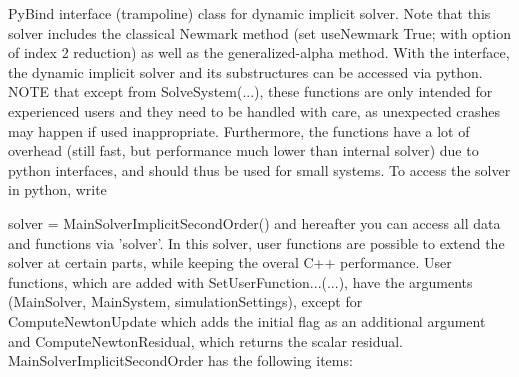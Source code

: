  \label{sec:MainSolverImplicitSecondOrder}
PyBind interface (trampoline) class for dynamic implicit solver. Note that this solver includes the classical Newmark method (set useNewmark True; with option of index 2 reduction) as well as the generalized-alpha method. With the interface, the dynamic implicit solver and its substructures can be accessed via python. NOTE that except from SolveSystem(...), these functions are only intended for experienced users and they need to be handled with care, as unexpected crashes may happen if used inappropriate. Furthermore, the functions have a lot of overhead (still fast, but performance much lower than internal solver) due to python interfaces, and should thus be used for small systems. To access the solver in python, write \bi
 \item[] solver = MainSolverImplicitSecondOrder() 
\ei
 and hereafter you can access all data and functions via 'solver'.
 In this solver, user functions are possible to extend the solver at certain parts, while keeping the overal C++ performance. User functions, which are added with SetUserFunction...(...), have the arguments (MainSolver, MainSystem, simulationSettings), except for ComputeNewtonUpdate which adds the initial flag as an additional argument and ComputeNewtonResidual, which returns the scalar residual.\\ 
%
MainSolverImplicitSecondOrder has the following items:
